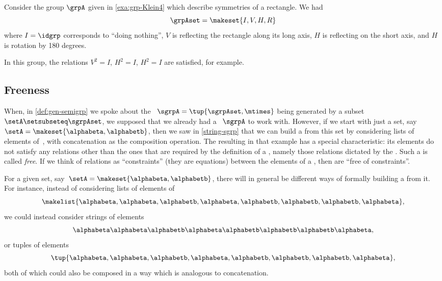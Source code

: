 \begin{example}
    Consider the group $\grpA$ given in \cref{exa:grp-Klein4} which describe symmetries of a rectangle.
    We had
    \begin{equation}
        \grpAset = \makeset{ I, V, H, R}
    \end{equation}
    where $I = \idgrp$ corresponds to ``doing nothing'', $V$ is reflecting the rectangle along its long axis, $H$ is reflecting on the short axis, and $H$ is rotation by 180 degrees.

    In this group, the relations $V^2 = I$, $H^2 = I$, $H^2 = I$ are satisfied, for example.
\end{example}

\subsection{Freeness}

When, in \cref{def:gen-semigrp} we spoke about the ~$\sgrpA = \tup{\sgrpAset, \mtimes}$ being generated by a subset~$\setA \setsubseteq \sgrpAset$, we supposed that we already had a ~$\sgrpA$ to work with.
However, if we start with just a set, say~$\setA = \makeset{ \alphabeta, \alphabetb}$, then we saw in \cref{string-sgrp} that we can build a  from this set by considering lists of elements of~\setA, with concatenation as the composition operation.
The resulting  in that example has a special characteristic: its elements do not satisfy any relations other than the ones that are required by the definition of a , namely those relations dictated by the .
Such a  is called \emph{free}.
If we think of relations as ``constraints'' (they are equations) between the elements of a , then  are ``free of constraints''.

For a given set, say~$\setA = \makeset{ \alphabeta, \alphabetb}$, there will in general be different ways of formally building a  from it.
For instance, instead of considering lists of elements of~\setA
\begin{equation}
    \makelist{\alphabeta,\alphabeta, \alphabetb, \alphabeta, \alphabetb, \alphabetb, \alphabetb, \alphabeta},
\end{equation}
we could instead consider strings of elements
\begin{equation}
    \alphabeta\alphabeta \alphabetb \alphabeta \alphabetb \alphabetb \alphabetb \alphabeta,
\end{equation}
or tuples of elements
\begin{equation}
    \tup{\alphabeta, \alphabeta, \alphabetb, \alphabeta, \alphabetb, \alphabetb, \alphabetb, \alphabeta},
\end{equation}
both of which could also be composed in a way which is analogous to concatenation.

